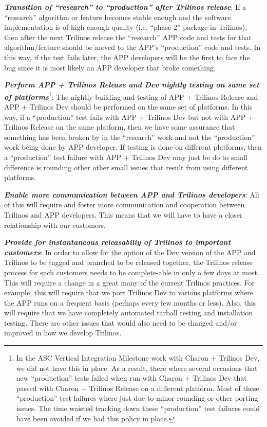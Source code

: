 \documentclass[pdf,ps2pdf,11pt]{SANDreport}
\begin{document}
{}\textit{\textbf{Transition of ``research'' to ``production'' after Trilinos
release}}: If a ``research'' algorithm or feature becomes stable enough and
the software implementation is of high enough quality (i.e. ``phase 2''
package in Trilinos), then after the next Trilinos release the ``research''
APP code and tests for that algorithm/feature should be moved to the APP's
``production'' code and tests.  In this way, if the test fails later, the APP
developers will be the first to face the bug since it is most likely an APP
developer that broke something.

{}\textit{\textbf{Perform APP + Trilinos Release and Dev nightly testing on
same set of platforms}}\footnote{In the ASC Vertical Integration Milestone
work with Charon + Trilinos Dev, we did not have this in place.  As a result,
there where several occasions that new ``production'' tests failed when run
with Charon + Trilinos Dev that passed with Charon + Trilinos Release on a
different platform.  Most of these ``production'' test failures where just due
to minor rounding or other porting issues.  The time waisted tracking down
these ``production'' test failures could have been avoided if we had this
policy in place.}: The nightly building and testing of APP + Trilinos Release
and APP + Trilinos Dev should be performed on the same set of platforms.  In
this way, if a ``production'' test fails with APP + Trilinos Dev but not with
APP + Trilinos Release on the same platform, then we have some assurance that
something has been broken by in the ``research'' work and not the
``production'' work being done by APP developer.  If testing is done on
different platforms, then a ``production'' test failure with APP + Trilinos
Dev may just be do to small difference is rounding other other small issues
that result from using different platforms.

{}\textit{\textbf{Enable more communication between APP and Trilinos developers}}:
All of this will require and foster more communication and cooperation between
Trilinos and APP developers.  This means that we will have to have a closer
relationship with our customers.

{}\textit{\textbf{Provide for instantaneous releasabiliy of Trilinos to important
customers}}: In order to allow for the option of the Dev version of the APP and
Trilinos to be tagged and branched to be released together, the Trilinos
release process for such customers needs to be complete-able in only a few days
at most.  This will require a change in a great many of the current Trilinos
practices.  For example, this will require that we port Trilinos Dev to
various platforms where the APP runs on a frequent basis (perhaps every few
months or less).  Also, this will require that we have completely automated
tarball testing and installation testing.  There are other issues that would
also need to be changed and/or improved in how we develop Trilinos.
\end{document}
